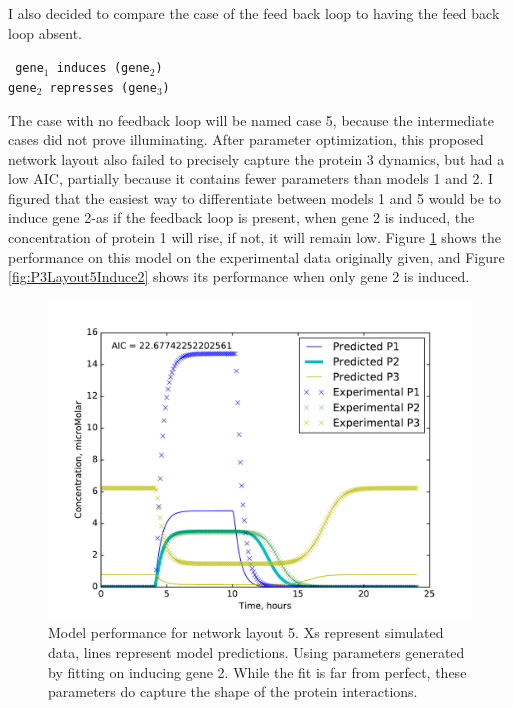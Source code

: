 \documentclass{article}
\begin{document}
I also decided to compare the case of the feed back loop to having the feed back loop absent. \\

\begin{centering}
\texttt{
gene$_1$ induces (gene$_2$)\\
gene$_2$ represses (gene$_3$)\\
}
\end{centering}

The case with no feedback loop will be named case 5, because the intermediate cases did not prove illuminating. After parameter optimization, this proposed network layout also failed to precisely capture the protein 3 dynamics, but had a low AIC, partially because it contains fewer parameters than models 1 and 2. I figured that the easiest way to differentiate between models 1 and 5 would be to induce gene 2-as if the feedback loop is present, when gene 2 is induced, the concentration of protein 1 will rise, if not, it will remain low. Figure \ref{fig:P3Layout5} shows the performance on this model on the experimental data originally given, and Figure \ref{fig:P3Layout5Induce2} shows its performance when only gene 2 is induced.  
\begin{figure}[!htb]
\includegraphics[width=12cm]{../Problem3/figures/postNMPlotLayout5WGene2Info}
\caption{Model performance for network layout 5. Xs represent simulated data, lines represent model predictions. Using parameters generated by fitting on inducing gene 2. While the fit is far from perfect, these parameters do capture the shape of the protein interactions.}
\label{fig:P3Layout5}
\end{figure}
\end{document}
